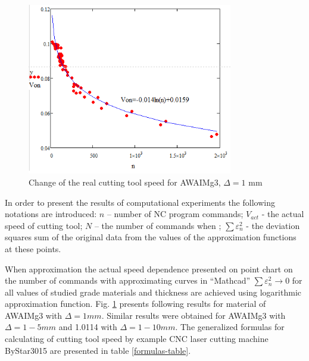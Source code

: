 \documentclass[runningheads]{llncs}
\begin{document}
\begin{figure}
  \begin{center}
  \includegraphics[width=0.8\textwidth]{plot.png}
  \caption{Change of the real cutting tool speed for AWAIMg3, $\Delta=1$ mm}
  \label{plot}
  \end{center}
\end{figure}

In order to present the results of computational experiments
the following notations are introduced:
$n$ – number of NC program commands;
$V_{act}$ - the actual speed of cutting tool;
$N$ – the number of commands when ;
$\sum \varepsilon_n^2$ - the deviation squares sum of the original data
from the values of the approximation functions at these points.

When approximation the actual speed dependence
presented on point chart on the number of commands
with approximating curves in ``Mathcad''
$\sum \varepsilon_n^2 \to 0$
for all values of studied grade materials
and thickness are achieved using logarithmic approximation function.
Fig. \ref{plot}
presents following results for material of AWAIMg3 with $\Delta=1 mm$.
Similar results were obtained for AWAIMg3 with $\Delta=1-5 mm$
and 1.0114 with $\Delta=1-10 mm$.
The generalized formulas for calculating of
cutting tool speed by example CNC laser cutting machine
ByStar3015 are presented in table \ref{formulas-table}.
\end{document}
